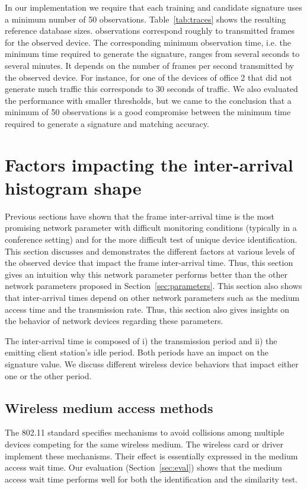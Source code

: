 \documentclass[10pt, conference, compsocconf, letterpaper]{IEEEtran}
\begin{document}
In our implementation we require that each training and candidate signature uses a
minimum number of 50 observations. Table~\ref{tab:traces} shows the resulting reference database sizes.  observations correspond roughly to  transmitted frames for the observed device.
The corresponding minimum observation time, i.e. the minimum time required to 
generate the signature, ranges from several seconds to several minutes.
It depends on the number of frames per second transmitted by the observed
device. For instance, for one of the devices of office 2 that did not generate much traffic this corresponds to 
30 seconds of traffic.
We also evaluated the performance with smaller thresholds, but we came to the conclusion 
that a minimum of 50 observations is a good compromise between the minimum time required to generate a signature and matching accuracy.

\section{Factors impacting the inter-arrival histogram shape}
\label{sec:factors}

Previous sections have shown that the frame inter-arrival time is the most promising network parameter 
with difficult monitoring conditions (typically in a conference setting) and for the more difficult 
test of unique device identification. This section discusses and demonstrates the different factors at various levels of the observed device that impact the frame inter-arrival time. 
Thus, this section gives an intuition why this network parameter performs better than the other network parameters proposed in Section~\ref{sec:parameters}.
This section also shows that inter-arrival times depend on other network parameters such as the medium access time and the transmission rate. Thus, this section also gives insights on the behavior of network devices regarding these parameters.

The inter-arrival time is composed of 
i) the transmission period and 
ii) the emitting client station's idle period.
Both periods have an impact on the signature value. We discuss different wireless device behaviors that impact either one or the other period.






\subsection{Wireless medium access methods}
\label{sec:accessmethods}
The 802.11 standard \cite{IEEE:80211} specifies mechanisms to avoid collisions among multiple devices competing for the same wireless medium. 
The wireless card or driver implement these mechanisms. Their effect is essentially expressed in the medium access wait time. 
Our evaluation (Section~\ref{sec:eval}) shows that the medium access wait time performs well for both the identification and the similarity test.
\end{document}
